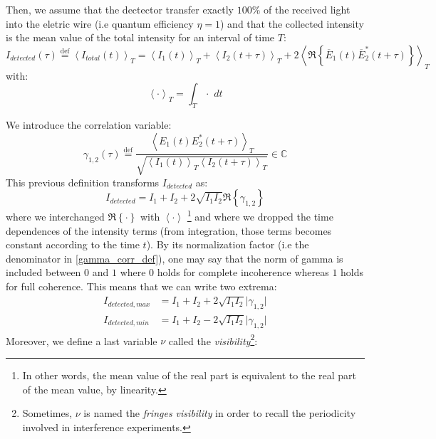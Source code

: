 \documentclass[12pt]{report}
\begin{document}
Then, we assume that the dectector transfer exactly $100\% $ of the received light into the eletric wire (i.e quantum efficiency $\eta = 1$) and that the collected intensity is the mean value of the total intensity for an interval of time $T$:
\begin{equation}
I_{detected}(\tau) \stackrel{\text{def}}{=} \left\langle I_{total}(t) \right\rangle_T = \left\langle I_1(t) \right\rangle_T + \left\langle I_2(t + \tau) \right\rangle _T + 2\left\langle \Re\left\lbrace \overline{E}_1(t) \overline{E}_2^*(t + \tau)\right\rbrace \right\rangle _T
\end{equation}
with:
\begin{equation}
\left\langle \cdot \right\rangle _T = \int_T \cdot \,\,dt
\end{equation}

We introduce the correlation variable:
\begin{equation}
\label{gamma_corr_def}
\gamma_{1,2}(\tau) \stackrel{\text{def}}{=} \frac{\left\langle E_1(t) E_2^*(t + \tau) \right\rangle _T}{\sqrt{\left\langle I_1(t) \right\rangle_T \left\langle I_2(t + \tau) \right\rangle _T }} \in \mathbb{C}
\end{equation}
This previous definition transforms $I_{detected}$ as:
\begin{equation}
I_{detected} = I_1 + I_2 + 2\sqrt{I_1 I_2} \Re \left\lbrace \gamma_{1,2} \right\rbrace
\end{equation}
where we interchanged $\Re \left\lbrace \cdot \right\rbrace$ with $\left\langle \cdot \right \rangle$ \footnote{In other words, the mean value of the real part is equivalent to the real part of the mean value, by linearity.} and where we dropped the time dependences of the intensity terms (from integration, those terms becomes constant according to the time $t$).
By its normalization factor (i.e the denominator in \eqref{gamma_corr_def}), one may say that the norm of gamma is included between $0$ and $1$ where $0$ holds for complete incoherence whereas $1$ holds for full coherence. This means that we can write two extrema:
\begin{align}
I_{detected, max} &= I_1 + I_2 + 2\sqrt{I_1 I_2} \vert \gamma_{1,2} \vert\\
I_{detected, min} &= I_1 + I_2 - 2\sqrt{I_1 I_2} \vert \gamma_{1,2} \vert
\end{align}
Moreover, we define a last variable $\nu$ called the \textit{visibility}\footnote{Sometimes, $\nu$ is named the \textit{fringes visibility} in order to recall the periodicity involved in interference experiments.}:
\end{document}
